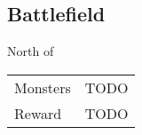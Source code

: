 \subsection{Battlefield}
\label{map:battlefield_11}

North of 

\begin{longtable}{ l p{9cm} }
	Monsters
	& TODO
\\
	Reward & TODO
\end{longtable}

